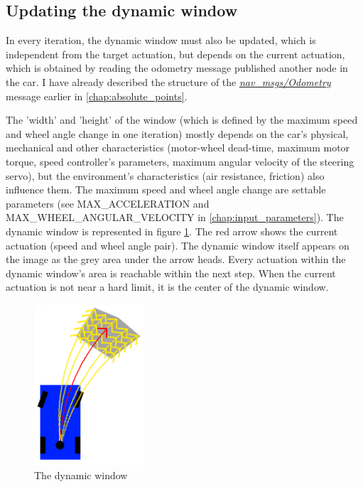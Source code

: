 \subsection{Updating the dynamic window}
In every iteration, the dynamic window must also be updated, which is independent from the target actuation, but depends on the current actuation, which is obtained by reading the odometry message published another node in the car. I have already described the structure of the \href{http://docs.ros.org/melodic/api/nav_msgs/html/msg/Odometry.html}{\textit{\textit{nav\_msgs/Odometry}}} message earlier in \ref{chap:absolute_points}.

The 'width' and 'height' of the window (which is defined by the maximum speed and wheel angle change in one iteration) mostly depends on the car's physical, mechanical and other characteristics (motor-wheel dead-time, maximum motor torque, speed controller's parameters, maximum angular velocity of the steering servo), but the environment's characteristics (air resistance, friction) also influence them. The maximum speed and wheel angle change are settable parameters (see MAX\_ACCELERATION and MAX\_WHEEL\_ANGULAR\_VELOCITY in \ref{chap:input_parameters}). The dynamic window is represented in figure \ref{dynamic_window}. The red arrow shows the current actuation (speed and wheel angle pair). The dynamic window itself appears on the image as the grey area under the arrow heads. Every actuation within the dynamic window's area is reachable within the next step. When the current actuation is not near a hard limit, it is the center of the dynamic window.

\begin{figure}[!ht]
    \centering
    \includegraphics[height=60mm]{figures/raw/dynamic_window.png}
    \caption{The dynamic window}
    \label{dynamic_window}
\end{figure}

